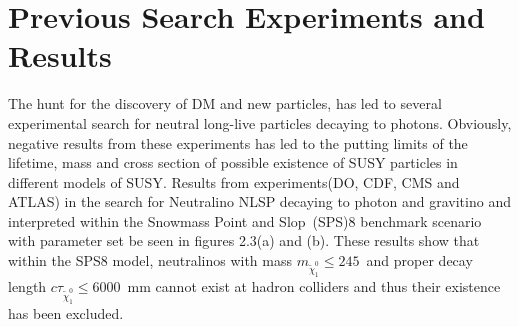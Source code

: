 {%
\section{Previous Search Experiments and Results}
The hunt for the discovery of DM and new particles, has led to several experimental search  for neutral long-live particles decaying to photons. Obviously, negative results from these experiments has led to the putting limits of the lifetime, mass and cross section of possible existence of SUSY particles in different models of SUSY. Results from experiments(DO, CDF, CMS and ATLAS)\cite{CMS7TeV,ATLAS7TeV} in the search for Neutralino NLSP decaying to photon and gravitino  and interpreted within the Snowmass Point and Slop~(SPS)8 benchmark\cite{SPS8} scenario with parameter set be seen in figures 2.3(a) and (b). These results show that within the SPS8 model, neutralinos with mass $m_{\tilde{\chi}^{0}_{1}} \leq 245$~\GeV and proper decay length $c\tau_{\tilde{\chi}^{0}_{1}} \leq 6000$~mm cannot exist at hadron colliders and thus their existence has been excluded.

}
